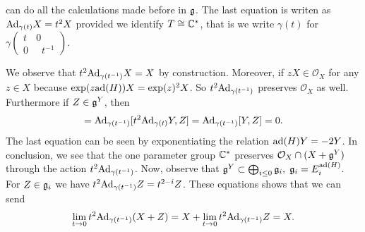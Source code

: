 can do all the calculations made before in $\mathfrak{g}$. The last equation is writen as $\text{Ad}_{\gamma(t)}X=t^2X$ provided we identify 
$T\cong \mathbb{C}^*$, that is we write $\gamma(t)$ for $\gamma\left(\begin{smallmatrix}t&0\\0&\;\;t^{-1}\end{smallmatrix}\right)$.\par 
We observe that $t^2\text{Ad}_{\gamma(t^{-1})}X=X$ by construction. Moreover, if $zX\in\mathcal{O}_X$ for any $z\in X$ because 
$\exp(z\text{ad}(H))X=\exp(z)^2X$. So $t^2\text{Ad}_{\gamma(t^{-1})}$ preserves $\mathcal{O}_X$ as well. Furthermore if $Z\in\mathfrak{g}^Y$, then 
\begin{equation}
    [Y,t^2\Ad_{\gamma(t^{-1})}Z]=\Ad_{\gamma(t^{-1})}[t^2\Ad_{\gamma(t)}Y,Z]=\Ad_{\gamma(t^{-1})}[Y,Z]=0.
\end{equation} 
The last equation can be seen by exponentiating the relation $\text{ad}(H)Y=-2Y$. In conclusion, we see that the one parameter group 
$\mathbb{C}^*$ preserves $\mathcal{O}_X\cap(X+\mathfrak{g}^Y)$ through the action $t^2\text{Ad}_{\gamma(t^{-1})}$. Now, observe that 
$\mathfrak{g}^Y\subset \bigoplus_{i\leq0}\mathfrak{g}_i,\;\mathfrak{g}_i=E_i^{\text{ad}(H)}$. For $Z\in\mathfrak{g}_i$ we have 
$t^2\text{Ad}_{\gamma(t^{-1})}Z=t^{2-i}Z$. These equations shows that we can send 
\begin{equation}
    \lim_{t\to 0}t^2\text{Ad}_{\gamma(t^{-1})}(X+Z)=X+\lim_{t\to0}t^2\text{Ad}_{\gamma(t^{-1})}Z= X.
\end{equation}

